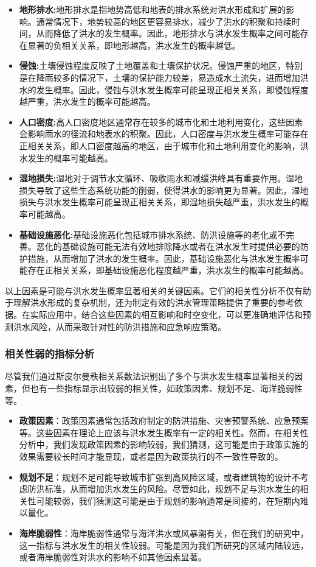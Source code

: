 \documentclass[withoutpreface,bwprint]{cumcmthesis} %
\begin{document}
\begin{itemize}
	\item \textbf{地形排水:}地形排水是指地势高低和地表的排水系统对洪水形成和扩展的影响。通常情况下，地势较高的地区更容易排水，减少了洪水的积聚和持续时间，从而降低了洪水的发生概率。因此，地形排水与洪水发生概率之间可能存在显著的负相关关系，即地形越高，洪水发生的概率越低。
	\item \textbf{侵蚀:}土壤侵蚀程度反映了土地覆盖和土壤保护状况。侵蚀严重的地区，特别是在降雨较多的情况下，土壤的保护能力较差，易造成水土流失，进而增加洪水的发生概率。因此，侵蚀与洪水发生概率可能呈现正相关关系，即侵蚀程度越严重，洪水发生的概率可能越高。
	\item \textbf{人口密度:}高人口密度地区通常存在较多的城市化和土地利用变化，这些因素会影响雨水的径流和地表水的积聚。因此，人口密度与洪水发生概率可能存在正相关关系，即人口密度越高的地区，由于城市化和土地利用变化的影响，洪水发生的概率可能越高。
	\item \textbf{湿地损失:}湿地对于调节水文循环、吸收雨水和减缓洪峰具有重要作用。湿地损失导致了这些生态系统功能的削弱，使得洪水的影响更为显著。因此，湿地损失与洪水发生概率可能呈现正相关关系，即湿地损失越严重，洪水发生的概率可能越高。
	\item \textbf{基础设施恶化:}基础设施恶化包括城市排水系统、防洪设施等的老化或不完善。恶化的基础设施可能无法有效地排除降水或者在洪水发生时提供必要的防护措施，从而增加了洪水的发生概率。因此，基础设施恶化与洪水发生概率可能存在正相关关系，即基础设施恶化程度越严重，洪水发生的概率可能越高。
\end{itemize}
以上因素是可能与洪水发生概率显著相关的关键因素。它们的相关性分析不仅有助于理解洪水形成的复杂机制，还为制定有效的洪水管理策略提供了重要的参考依据。在实际应用中，结合这些因素的相互影响和时空变化，可以更准确地评估和预测洪水风险，从而采取针对性的防洪措施和应急响应策略。
\subsubsection{相关性弱的指标分析}

尽管我们通过斯皮尔曼秩相关系数法识别出了多个与洪水发生概率显著相关的因素，但也有一些指标显示出较弱的相关性，如政策因素、规划不足、海洋脆弱性等。

\begin{itemize}
	\item \textbf{政策因素}：政策因素通常包括政府制定的防洪措施、灾害预警系统、应急预案等。这些因素在理论上应该与洪水发生概率有一定的相关性。然而，在相关性分析中，我们发现政策因素的影响较弱，我们猜测，这可能是由于政策实施的效果需要较长时间才能显现，或者是因为政策执行的不一致性导致的。
	
	\item \textbf{规划不足}：规划不足可能导致城市扩张到高风险区域，或者建筑物的设计不考虑防洪标准，从而增加洪水发生的风险。尽管如此，规划不足与洪水发生的相关性可能较弱，我们猜测这可能是由于规划的影响通常是间接的，在短期内难以量化。
	
	\item \textbf{海岸脆弱性}：海岸脆弱性通常与海洋洪水或风暴潮有关，但在我们的研究中，这一指标与洪水发生的相关性较弱。可能是因为我们所研究的区域内陆较远，或者海岸脆弱性对洪水的影响不如其他因素显著。
	
\end{itemize}
\end{document}
